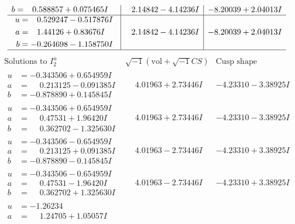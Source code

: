 \documentclass[1p]{elsarticle_modified}
\theoremstyle{definition}
\newcommand{\I}{\sqrt{-1}}
\begin{document}
$$\begin{array}{c|c|c}
\begin{aligned}
b &= \phantom{-}0.588857 + 0.075465 I\end{aligned}
 & \phantom{-}2.14842 - 4.14236 I & -8.20039 + 2.04013 I \\ \hline\begin{aligned}
u &= \phantom{-}0.529247 - 0.517876 I \\
a &= \phantom{-}1.44126 + 0.83676 I \\
b &= -0.264698 - 1.158750 I\end{aligned}
 & \phantom{-}2.14842 - 4.14236 I & -8.20039 + 2.04013 I\\
 \hline 
 \end{array}$$\newpage$$\begin{array}{c|c|c}  
\text{Solutions to }I^u_{2}& \I (\text{vol} + \sqrt{-1}CS) & \text{Cusp shape}\\
 \hline 
\begin{aligned}
u &= -0.343506 + 0.654959 I \\
a &= \phantom{-}0.213125 - 0.091385 I \\
b &= -0.878890 + 0.145845 I\end{aligned}
 & \phantom{-}4.01963 + 2.73446 I & -4.23310 - 3.38925 I \\ \hline\begin{aligned}
u &= -0.343506 + 0.654959 I \\
a &= \phantom{-}0.47531 + 1.96420 I \\
b &= \phantom{-}0.362702 - 1.325630 I\end{aligned}
 & \phantom{-}4.01963 + 2.73446 I & -4.23310 - 3.38925 I \\ \hline\begin{aligned}
u &= -0.343506 - 0.654959 I \\
a &= \phantom{-}0.213125 + 0.091385 I \\
b &= -0.878890 - 0.145845 I\end{aligned}
 & \phantom{-}4.01963 - 2.73446 I & -4.23310 + 3.38925 I \\ \hline\begin{aligned}
u &= -0.343506 - 0.654959 I \\
a &= \phantom{-}0.47531 - 1.96420 I \\
b &= \phantom{-}0.362702 + 1.325630 I\end{aligned}
 & \phantom{-}4.01963 - 2.73446 I & -4.23310 + 3.38925 I \\ \hline\begin{aligned}
u &= -1.26234\phantom{ +0.000000I} \\
a &= \phantom{-}1.24705 + 1.05057 I \\

\end{aligned}
\end{array}$$
\end{document}
